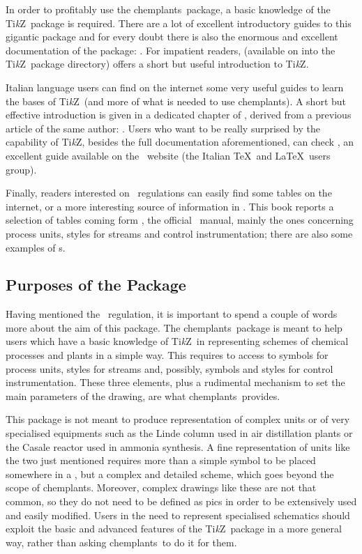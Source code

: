 \documentclass[12pt]{article}						%
\newcommand*{\ac}[1]{%
		\textsmaller{#1}%
	}
\newcommand*{\chemplants}{chemplants}
\newcommand*{\TikZ}{Ti\textit{k}Z}
\newcommand*{\UNICHIM}{\ac{UNICHIM}}
\begin{document}
In order to profitably use the \chemplants\ package, a basic knowledge of the
\TikZ\ package is required. There are a lot of excellent introductory guides to
this gigantic package and for every doubt there is also the enormous and
excellent documentation of the package: \cite{tantau:tikz}. For impatient
readers, \cite{cremer:tikz} (available on \ac{CTAN} into the \TikZ\ package
directory) offers a short but useful introduction to \TikZ.

Italian language users can find on the internet some very useful guides
to learn the bases of \TikZ\ (and more of what is needed to use \chemplants). A
short but effective introduction is given in a dedicated chapter of
\cite{pantieri:latexpedia}, derived from a previous article of the same author:
\cite{pantieri:artedi}. Users who want to be really surprised by the capability
of \TikZ, besides the full documentation aforementioned, can check
\cite{fiadrino:tikz}, an excellent guide available on the \GuIT\ website (the
Italian \TeX\ and \LaTeX\ users group).

Finally, readers interested on \UNICHIM\ regulations can easily find some
tables on the internet, or a more interesting source of information in
\cite{cacciatore:disegno}. This book reports a selection of tables coming form
\cite{unichim:impianti}, the official \UNICHIM\ manual, mainly the ones
concerning process units, styles for streams and control instrumentation; there
are also some examples of \ac{PFD}s.

\subsection{Purposes of the Package}

Having mentioned the \UNICHIM\ regulation, it is important to spend a couple
of words more about the aim of this package. The \chemplants\ package is meant
to help users which have a basic knowledge of \TikZ\ in representing schemes of
chemical processes and plants in a simple way. This requires to access to symbols
for process units, styles for streams and, possibly, symbols and styles for
control instrumentation. These three elements, plus a rudimental mechanism to
set the main parameters of the drawing, are what \chemplants\ provides.

This package is not meant to produce representation of complex units or of very
specialised equipments such as the Linde column used in air distillation plants
or the Casale reactor used in ammonia synthesis. A fine representation of units
like the two just mentioned requires more than a simple symbol to be placed
somewhere in a \ac{PFD}, but a complex and detailed scheme, which goes beyond the
scope of \chemplants. Moreover, complex drawings like these are not that common,
so they do not need to be defined as pics in order to be extensively used and
easily modified. Users in the need to represent specialised schematics should
exploit the basic and advanced features of the \TikZ\ package in a more general
way, rather than asking \chemplants\ to do it for them.
\end{document}
